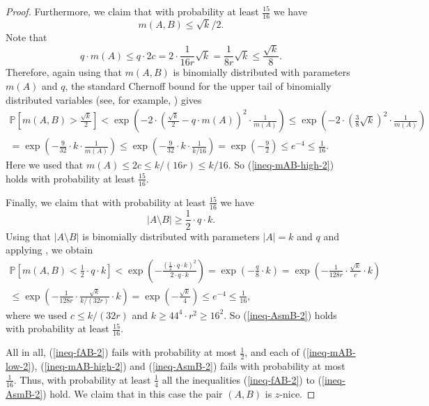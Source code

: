 \begin{proof}
Furthermore, we claim that with probability at least $\frac{15}{16}$ we have
\begin{equation}\label{ineq-mAB-high-2}
m(A,B)\leq \sqrt{k}/2.
\end{equation}
Note that
\[q\cdot m(A)\leq q\cdot 2c=2\cdot \frac{1}{16r}\sqrt{k}=\frac{1}{8r}\sqrt{k}\leq \frac{\sqrt{k}}{8}.\]
Therefore, again using that $m(A,B)$ is binomially distributed with parameters $m(A)$ and $q$, the standard Chernoff bound for the upper tail of binomially distributed variables (see, for example, \cite[Theorem A.1.4]{alon-spencer}) gives
\begin{multline*}
\mathbb{P}\left[m(A,B)> \frac{\sqrt{k}}{2}\right]<\exp\left(-2\cdot \left(\frac{\sqrt{k}}{2}-q\cdot m(A)\right)^2\cdot \frac{1}{m(A)}\right)\leq \exp\left(-2\cdot \left(\frac{3}{8}\sqrt{k}\right)^2\cdot \frac{1}{m(A)}\right)\\
=\exp\left(-\frac{9}{32}\cdot k\cdot \frac{1}{m(A)}\right)\leq \exp\left(-\frac{9}{32}\cdot k\cdot \frac{1}{k/16}\right)=\exp\left(-\frac{9}{2}\right)\leq e^{-4}\leq \frac{1}{16}.
\end{multline*}
Here we used that $m(A)\leq 2c\leq k/(16r)\leq k/16$. So (\ref{ineq-mAB-high-2}) holds with probability at least $\frac{15}{16}$.

Finally, we claim that with probability at least $\frac{15}{16}$ we have
\begin{equation}\label{ineq-AsmB-2}
\vert A\setminus B\vert\geq \frac{1}{2}\cdot q \cdot k.
\end{equation}
Using that $\vert A\setminus B\vert$ is binomially distributed with parameters $\vert A\vert=k$ and $q$ and applying \cite[Theorem A.1.13]{alon-spencer}, we obtain
\begin{multline*}
\mathbb{P}\left[m(A,B)< \frac{1}{2}\cdot q \cdot k\right]<\exp\left(-\frac{\left(\frac{1}{2}\cdot q \cdot k\right)^2}{2\cdot q\cdot k}\right)=\exp\left(-\frac{q}{8}\cdot k\right)=\exp\left(-\frac{1}{128r}\cdot \frac{\sqrt{k}}{c}\cdot k\right)\\
\leq \exp\left(-\frac{1}{128r}\cdot \frac{\sqrt{k}}{k/(32r)}\cdot k\right)=\exp\left(-\frac{\sqrt{k}}{4}\right)\leq e^{-4}\leq \frac{1}{16},
\end{multline*}
where we used $c\leq k/(32r)$ and $k\geq 44^4 \cdot r^2\geq 16^2$. So (\ref{ineq-AsmB-2}) holds with probability at least $\frac{15}{16}$.

All in all, (\ref{ineq-fAB-2}) fails with probability at most $\frac{1}{2}$,  and each of (\ref{ineq-mAB-low-2}), (\ref{ineq-mAB-high-2}) and  (\ref{ineq-AsmB-2}) fails with probability at most $\frac{1}{16}$. Thus, with probability at least $\frac{1}{4}$ all the inequalities (\ref{ineq-fAB-2}) to (\ref{ineq-AsmB-2}) hold. We claim that in this case the pair $(A,B)$ is $z$-nice.


\end{proof}
